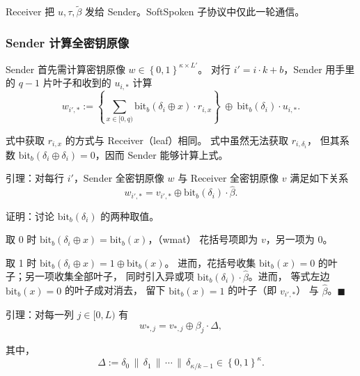 Receiver 把 $u,\tau,\tilde\beta$ 发给 Sender。SoftSpoken
子协议中仅此一轮通信。

\subsubsection{Sender 计算全密钥原像}

Sender 首先需计算密钥原像 $w\in\left\{0,1\right\}^{\kappa\times L'}$。
对行 $i' = i\cdot k + b$，Sender
用手里的 $q-1$ 片叶子和收到的 $u_{i,*}$ 计算
\begin{equation}\label{eq:05-softspoken:wmat}
w_{i',*} := \left\{
    \sum_{x \in [0, q)}
    \mathrm{bit}_b(\delta_i \oplus x) \cdot r_{i,x}
\right\} 
~ \oplus ~
\mathrm{bit}_b(\delta_i) \cdot u_{i,*}. \tag{wmat}
\end{equation}

式中获取 $r_{i,x}$ 的方式与 Receiver（leaf）相同。
式中虽然无法获取 $r_{i,\delta_i}$，
但其系数 $\mathrm{bit}_b(\delta_i \oplus \delta_i) = 0$，因而 Sender
能够计算上式。

引理：对每行 $i'$，Sender 全密钥原像 $w$ 与 Receiver
全密钥原像 $v$ 满足如下关系
\begin{equation}\label{eq:05-softspoken:wv-row-eq}
w_{i',*} = v_{i',*} \oplus \mathrm{bit}_b(\delta_i) \cdot\hat\beta. \tag{wv-row-eq}
\end{equation}

证明：讨论 $\mathrm{bit}_b(\delta_i)$ 的两种取值。

取 0 时 $\mathrm{bit}_b(\delta_i \oplus x) = \mathrm{bit}_b(x)$，（wmat）
花括号项即为 $v$，另一项为 0。

取 1
时 $\mathrm{bit}_b(\delta_i \oplus x) = 1 \oplus \mathrm{bit}_b(x)$。
进而，花括号收集 $\mathrm{bit}_b(x)=0$ 的叶子；另一项收集全部叶子，
同时引入异或项 $\mathrm{bit}_b(\delta_i)\cdot\hat\beta$。进而，
等式左边 $\mathrm{bit}_b(x)=0$ 的叶子成对消去，
留下 $\mathrm{bit}_b(x)=1$ 的叶子（即 $v_{i',*}$）
与 $\hat\beta$。$\blacksquare$

引理：对每一列 $j \in [0, L)$ 有
\begin{equation}\label{eq:05-softspoken:wv-eq}
w_{*,j} = v_{*,j} \oplus \beta_j \cdot \Delta, \tag{wv-eq}
\end{equation}

其中，
\begin{equation}\label{eq:05-softspoken:delta}
\Delta := \delta_0 \,\|\, \delta_1 \,\|\, \cdots \,\|\, \delta_{\kappa/k - 1} \in \left\{0,1\right\}^{\kappa}. \tag{delta}
\end{equation}

